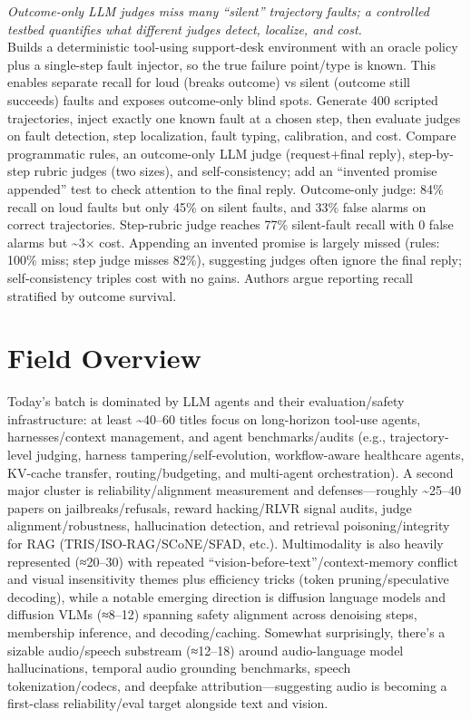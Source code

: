 \documentclass[12pt,letterpaper]{article}
\begin{document}
{\small\textit{Outcome-only LLM judges miss many ``silent'' trajectory faults; a controlled testbed quantifies what different judges detect, localize, and cost.}}\\[1pt]
{\footnotesize Builds a deterministic tool-using support-desk environment with an oracle policy plus a single-step fault injector, so the true failure point/type is known. This enables separate recall for loud (breaks outcome) vs silent (outcome still succeeds) faults and exposes outcome-only blind spots. Generate 400 scripted trajectories, inject exactly one known fault at a chosen step, then evaluate judges on fault detection, step localization, fault typing, calibration, and cost. Compare programmatic rules, an outcome-only LLM judge (request+final reply), step-by-step rubric judges (two sizes), and self-consistency; add an ``invented promise appended'' test to check attention to the final reply. Outcome-only judge: 84\% recall on loud faults but only 45\% on silent faults, and 33\% false alarms on correct trajectories. Step-rubric judge reaches 77\% silent-fault recall with 0 false alarms but \textasciitilde{}3× cost. Appending an invented promise is largely missed (rules: 100\% miss; step judge misses 82\%), suggesting judges often ignore the final reply; self-consistency triples cost with no gains. Authors argue reporting recall stratified by outcome survival.}

\medskip



\section*{Field Overview}
{\footnotesize Today's batch is dominated by LLM agents and their evaluation/safety infrastructure: at least \textasciitilde{}40--60 titles focus on long-horizon tool-use agents, harnesses/context management, and agent benchmarks/audits (e.g., trajectory-level judging, harness tampering/self-evolution, workflow-aware healthcare agents, KV-cache transfer, routing/budgeting, and multi-agent orchestration). A second major cluster is reliability/alignment measurement and defenses---roughly \textasciitilde{}25--40 papers on jailbreaks/refusals, reward hacking/RLVR signal audits, judge alignment/robustness, hallucination detection, and retrieval poisoning/integrity for RAG (TRIS/ISO-RAG/SCoNE/SFAD, etc.). Multimodality is also heavily represented (≈20--30) with repeated ``vision-before-text''/context-memory conflict and visual insensitivity themes plus efficiency tricks (token pruning/speculative decoding), while a notable emerging direction is diffusion language models and diffusion VLMs (≈8--12) spanning safety alignment across denoising steps, membership inference, and decoding/caching. Somewhat surprisingly, there's a sizable audio/speech substream (≈12--18) around audio-language model hallucinations, temporal audio grounding benchmarks, speech tokenization/codecs, and deepfake attribution---suggesting audio is becoming a first-class reliability/eval target alongside text and vision.}
\end{document}
